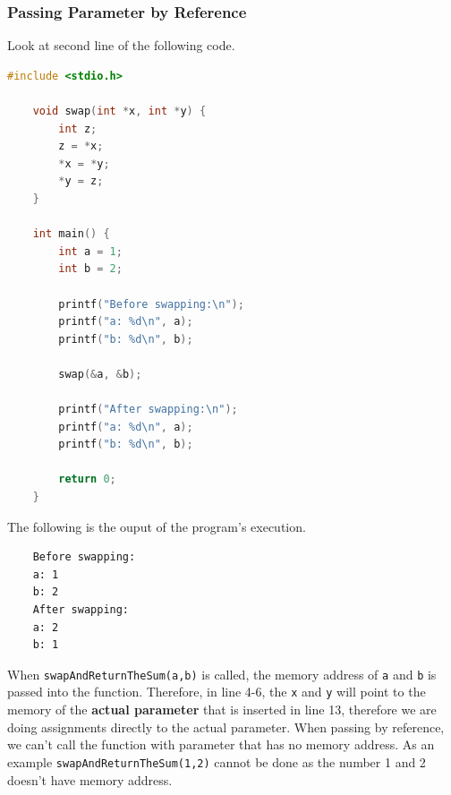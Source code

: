 \subsubsection{Passing Parameter by Reference}
Look at second line of the following code.
\begin{lstlisting}[language=c,caption = Passing by Reference,label=lst:passbyreference01]
    #include <stdio.h>

    void swap(int *x, int *y) {
        int z;
        z = *x;
        *x = *y;
        *y = z;
    }
    
    int main() {
        int a = 1;
        int b = 2;
        
        printf("Before swapping:\n");
        printf("a: %d\n", a);
        printf("b: %d\n", b);
        
        swap(&a, &b);
        
        printf("After swapping:\n");
        printf("a: %d\n", a);
        printf("b: %d\n", b);
        
        return 0;
    }
\end{lstlisting}
The following is the ouput of the program's execution.
\begin{verbatim}
    Before swapping:
    a: 1
    b: 2
    After swapping:
    a: 2
    b: 1
\end{verbatim}

When \verb|swapAndReturnTheSum(a,b)| is called, 
the memory address of \verb|a| and \verb|b| is passed into 
the function. Therefore, in line 4-6, the \verb|x| and 
\verb|y| will point to the memory of the \textbf{actual parameter} 
that is inserted in line 13, therefore we are doing assignments 
directly to the actual parameter. When passing by reference, 
we can't call the function with parameter that has no memory 
address. As an example \verb|swapAndReturnTheSum(1,2)| cannot be 
done as the number 1 and 2 doesn't have memory address.

